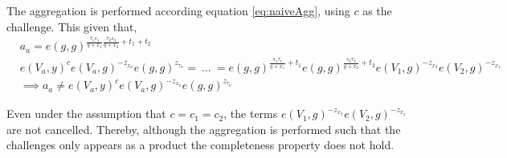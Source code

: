 The aggregation is performed according equation \eqref{eq:naiveAgg}, using $c$ as the challenge. This given that,
\begin{align*}
& a_a = e(g,g) ^{\frac{\tau_1 s_1}{q+x_1} \frac{\tau_2 s_2}{q+x_2} +t_1+t_2} 
\\
& e(V_a,y)^ce(V_a,g)^{-z_{x_a}}e(g,g)^{z_{\tau_a}}  = \: ... \:= 
  e(g,g)^{ \frac{s_1 \tau_1}{q+x_1}+t_1} e(g,g)^{ \frac{s_2 \tau_2}{q+x_2}+t_2}   e(V_1,g)^{- z_{x_2} }   e(V_2,g)^{ - z_{x_1} }
   \\
 & \implies a_a \neq e(V_a,y)^ce(V_a,g)^{-z_{x_a}}e(g,g)^{z_{\tau_a}} 
\end{align*}

Even under the assumption that $c= c_1=c_2$, the terms $e(V_1,g)^{- z_{x_2} }   e(V_2,g)^{ - z_{x_1} }$ are not cancelled. Thereby, although the aggregation is performed such that the challenges only appears as a product the completeness property does not hold.  


